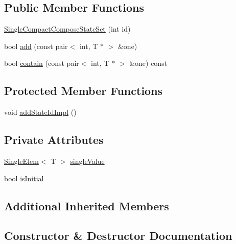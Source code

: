 \subsection*{Public Member Functions}
\begin{DoxyCompactItemize}
\item 
\mbox{\hyperlink{classgraphsat_1_1_single_compact_compose_state_set_a78a30b07787cbc213bb977152d4e4277}{Single\+Compact\+Compose\+State\+Set}} (int id)
\item 
bool \mbox{\hyperlink{classgraphsat_1_1_single_compact_compose_state_set_a7f5aa3bcf4d884372d99fe33402a4f0a}{add}} (const pair$<$ int, T $\ast$ $>$ \&one)
\item 
bool \mbox{\hyperlink{classgraphsat_1_1_single_compact_compose_state_set_ac42bca39e3e7a2eabaacba1e978b11ef}{contain}} (const pair$<$ int, T $\ast$ $>$ \&one) const
\end{DoxyCompactItemize}
\subsection*{Protected Member Functions}
\begin{DoxyCompactItemize}
\item 
void \mbox{\hyperlink{classgraphsat_1_1_single_compact_compose_state_set_a9ac36db887993967dd58f3a3e4ee7551}{add\+State\+Id\+Impl}} ()
\end{DoxyCompactItemize}
\subsection*{Private Attributes}
\begin{DoxyCompactItemize}
\item 
\mbox{\hyperlink{classgraphsat_1_1_single_elem}{Single\+Elem}}$<$ T $>$ \mbox{\hyperlink{classgraphsat_1_1_single_compact_compose_state_set_ab29d50aef4a9fc8b01e9a7094fb50a1c}{single\+Value}}
\item 
bool \mbox{\hyperlink{classgraphsat_1_1_single_compact_compose_state_set_a5f9f8e1462a498a29f81e8b31a978ccb}{is\+Initial}}
\end{DoxyCompactItemize}
\subsection*{Additional Inherited Members}


\subsection{Constructor \& Destructor Documentation}
\mbox{\label{classgraphsat_1_1_single_compact_compose_state_set_a78a30b07787cbc213bb977152d4e4277}} 
